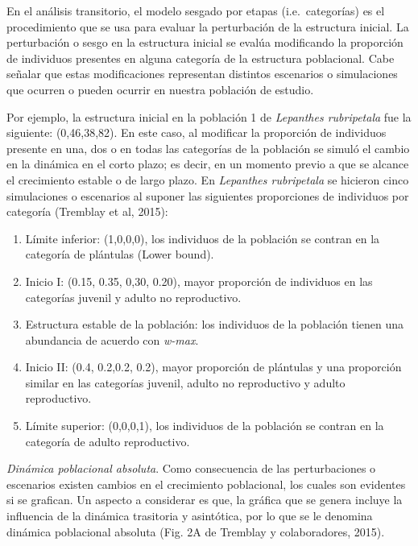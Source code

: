 \documentclass[
]{book}
\providecommand{\tightlist}{%
  \setlength{\itemsep}{0pt}\setlength{\parskip}{0pt}}
\theoremstyle{definition}
\theoremstyle{definition}
\theoremstyle{definition}
\theoremstyle{definition}
\theoremstyle{remark}
\begin{document}
En el análisis transitorio, el modelo sesgado por etapas (i.e.~categorías) es el procedimiento que se usa para evaluar la perturbación de la estructura inicial. La perturbación o sesgo en la estructura inicial se evalúa modificando la proporción de individuos presentes en alguna categoría de la estructura poblacional. Cabe señalar que estas modificaciones representan distintos escenarios o simulaciones que ocurren o pueden ocurrir en nuestra población de estudio.

Por ejemplo, la estructura inicial en la población 1 de \emph{Lepanthes rubripetala} fue la siguiente: (0,46,38,82). En este caso, al modificar la proporción de individuos presente en una, dos o en todas las categorías de la población se simuló el cambio en la dinámica en el corto plazo; es decir, en un momento previo a que se alcance el crecimiento estable o de largo plazo. En \emph{Lepanthes rubripetala} se hicieron cinco simulaciones o escenarios al suponer las siguientes proporciones de individuos por categoría (Tremblay et al, 2015):

\begin{enumerate}
\def\labelenumi{\arabic{enumi}.}
\tightlist
\item
  Límite inferior: (1,0,0,0), los individuos de la población se contran en la categoría de plántulas (Lower bound).
\item
  Inicio I: (0.15, 0.35, 0,30, 0.20), mayor proporción de individuos en las categorías juvenil y adulto no reproductivo.
\item
  Estructura estable de la población: los individuos de la población tienen una abundancia de acuerdo con \emph{w-max}.
\item
  Inicio II: (0.4, 0.2,0.2, 0.2), mayor proporción de plántulas y una proporción similar en las categorías juvenil, adulto no reproductivo y adulto reproductivo.
\item
  Límite superior: (0,0,0,1), los individuos de la población se contran en la categoría de adulto reproductivo.
\end{enumerate}

\emph{Dinámica poblacional absoluta}. Como consecuencia de las perturbaciones o escenarios existen cambios en el crecimiento poblacional, los cuales son evidentes si se grafican. Un aspecto a considerar es que, la gráfica que se genera incluye la influencia de la dinámica trasitoria y asintótica, por lo que se le denomina dinámica poblacional absoluta (Fig. 2A de Tremblay y colaboradores, 2015).
\end{document}
